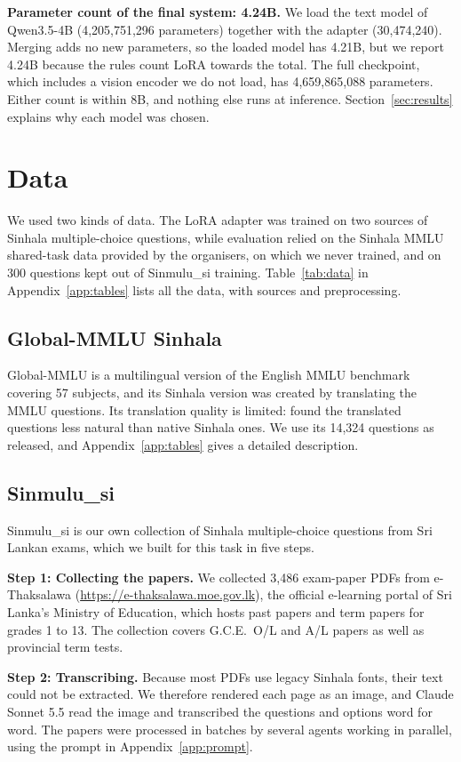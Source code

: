 \documentclass[11pt]{article}
\newcommand{\para}[1]{\smallskip\noindent\textbf{#1}\enspace}
\newcommand{\sinmulu}{Sinmulu\_si}
\begin{document}
\para{Parameter count of the final system: 4.24B.} We load the text model of Qwen3.5-4B (4,205,751,296 parameters) together with the adapter (30,474,240). Merging adds no new parameters, so the loaded model has 4.21B, but we report 4.24B because the rules count LoRA towards the total. The full checkpoint, which includes a vision encoder we do not load, has 4,659,865,088 parameters. Either count is within 8B, and nothing else runs at inference. Section~\ref{sec:results} explains why each model was chosen.

\section{Data}\label{sec:data}
We used two kinds of data. The LoRA adapter was trained on two sources of Sinhala multiple-choice questions, while evaluation relied on the Sinhala MMLU shared-task data provided by the organisers, on which we never trained, and on 300 questions kept out of \sinmulu{} training. Table~\ref{tab:data} in Appendix~\ref{app:tables} lists all the data, with sources and preprocessing.

\subsection{Global-MMLU Sinhala}
Global-MMLU \citep{singh2025globalmmlu} is a multilingual version of the English MMLU benchmark covering 57 subjects, and its Sinhala version was created by translating the MMLU questions. Its translation quality is limited: \citet{pramodya2025sinhalammlu} found the translated questions less natural than native Sinhala ones. We use its 14,324 questions as released, and Appendix~\ref{app:tables} gives a detailed description.

\subsection{\sinmulu{}}\label{sec:sinmulu}
\sinmulu{} is our own collection of Sinhala multiple-choice questions from Sri Lankan exams, which we built for this task in five steps.

\para{Step 1: Collecting the papers.} We collected 3,486 exam-paper PDFs from e-Thaksalawa (\url{https://e-thaksalawa.moe.gov.lk}), the official e-learning portal of Sri Lanka's Ministry of Education, which hosts past papers and term papers for grades 1 to 13. The collection covers G.C.E.\ O/L and A/L papers as well as provincial term tests.

\para{Step 2: Transcribing.} Because most PDFs use legacy Sinhala fonts, their text could not be extracted. We therefore rendered each page as an image, and Claude Sonnet 5.5 read the image and transcribed the questions and options word for word. The papers were processed in batches by several agents working in parallel, using the prompt in Appendix~\ref{app:prompt}.
\end{document}
